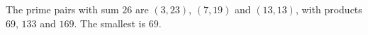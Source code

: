 The prime pairs with sum $26$ are $(3,23)$, $(7,19)$ and $(13,13)$, with products $69$, $133$ and $169$. The smallest is $\boxed{69}$.
